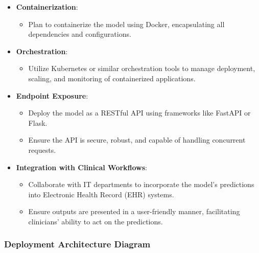 \documentclass{article}
\begin{document}
\begin{itemize}[leftmargin=*]
    \item \textbf{Containerization}:
        \begin{itemize}[leftmargin=*]
            \item Plan to containerize the model using Docker, encapsulating all dependencies and configurations.
        \end{itemize}
    \item \textbf{Orchestration}:
        \begin{itemize}[leftmargin=*]
            \item Utilize Kubernetes or similar orchestration tools to manage deployment, scaling, and monitoring of containerized applications.
        \end{itemize}
    \item \textbf{Endpoint Exposure}:
        \begin{itemize}[leftmargin=*]
            \item Deploy the model as a RESTful API using frameworks like FastAPI or Flask.
            \item Ensure the API is secure, robust, and capable of handling concurrent requests.
        \end{itemize}
    \item \textbf{Integration with Clinical Workflows}:
        \begin{itemize}[leftmargin=*]
            \item Collaborate with IT departments to incorporate the model's predictions into Electronic Health Record (EHR) systems.
            \item Ensure outputs are presented in a user-friendly manner, facilitating clinicians' ability to act on the predictions.
        \end{itemize}
\end{itemize}

\subsubsection{Deployment Architecture Diagram}
\end{document}
